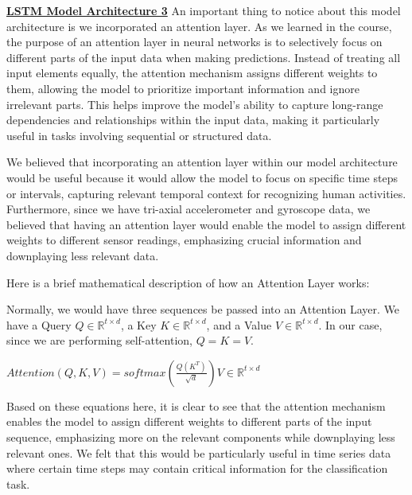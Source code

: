 \documentclass[conference]{IEEEtran}
\begin{document}
\textbf{\underline{LSTM Model Architecture 3}} \newline 
An important thing to notice about this model architecture is we incorporated an attention layer. As we learned in the course, the purpose of an attention layer in neural networks is to selectively focus on different parts of the input data when making predictions. Instead of treating all input elements equally, the attention mechanism assigns different weights to them, allowing the model to prioritize important information and ignore irrelevant parts. This helps improve the model's ability to capture long-range dependencies and relationships within the input data, making it particularly useful in tasks involving sequential or structured data. \newline 

We believed that incorporating an attention layer within our model architecture would be useful because it would allow the model to focus on specific time steps or intervals, capturing relevant temporal context for recognizing human activities. Furthermore, since we have tri-axial accelerometer and gyroscope data, we believed that having an attention layer would enable the model to assign different weights to different sensor readings, emphasizing crucial information and downplaying less relevant data. \newline 

Here is a brief mathematical description of how an Attention Layer works: \newline 

Normally, we would have three sequences be passed into an Attention Layer. We have a Query $Q \in \mathbb{R}^{t \times d}$, a Key $K \in \mathbb{R}^{t \times d}$, and a Value $V \in \mathbb{R}^{t \times d}$. In our case, since we are performing self-attention, $Q = K = V$. \newline 

$Attention(Q, K, V) = softmax(\frac{Q (K^T)}{\sqrt{d}}) V \in \mathbb{R}^{t \times d}$ \newline 

Based on these equations here, it is clear to see that the attention mechanism enables the model to assign different weights to different parts of the input sequence, emphasizing more on the relevant components while downplaying less relevant ones. We felt that this would be particularly useful in time series data where certain time steps may contain critical information for the classification task. \newline 
\end{document}
